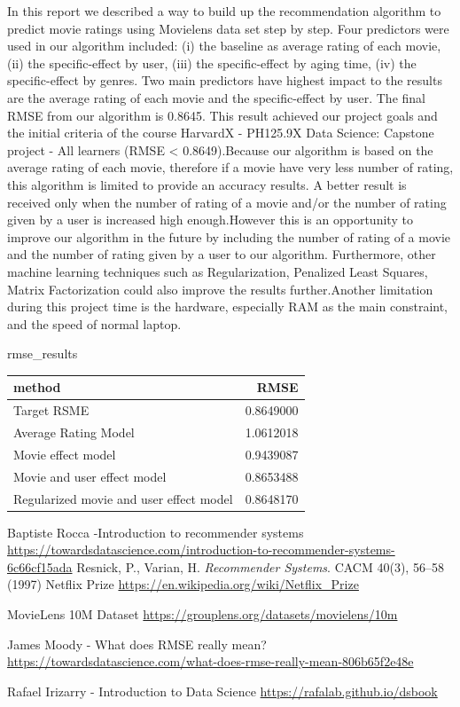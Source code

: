 \documentclass[]{article}
\newenvironment{Shaded}{\begin{snugshade}}{\end{snugshade}}
\newcommand{\NormalTok}[1]{#1}
\begin{document}
In this report we described a way to build up the recommendation
algorithm to predict movie ratings using Movielens data set step by
step. Four predictors were used in our algorithm included: (i) the
baseline as average rating of each movie, (ii) the specific-effect by
user, (iii) the specific-effect by aging time, (iv) the specific-effect
by genres. Two main predictors have highest impact to the results are
the average rating of each movie and the specific-effect by user. The
final RMSE from our algorithm is 0.8645. This result achieved our
project goals and the initial criteria of the course HarvardX - PH125.9X
Data Science: Capstone project - All learners (RMSE \textless{}
0.8649).Because our algorithm is based on the average rating of each
movie, therefore if a movie have very less number of rating, this
algorithm is limited to provide an accuracy results. A better result is
received only when the number of rating of a movie and/or the number of
rating given by a user is increased high enough.However this is an
opportunity to improve our algorithm in the future by including the
number of rating of a movie and the number of rating given by a user to
our algorithm. Furthermore, other machine learning techniques such as
Regularization, Penalized Least Squares, Matrix Factorization could also
improve the results further.Another limitation during this project time
is the hardware, especially RAM as the main constraint, and the speed of
normal laptop.

\begin{Shaded}
\begin{Highlighting}[]
\NormalTok{rmse_results}
\end{Highlighting}
\end{Shaded}

\begin{longtable}[]{@{}lr@{}}
\toprule
method & RMSE\tabularnewline
\midrule
\endhead
Target RSME & 0.8649000\tabularnewline
Average Rating Model & 1.0612018\tabularnewline
Movie effect model & 0.9439087\tabularnewline
Movie and user effect model & 0.8653488\tabularnewline
Regularized movie and user effect model & 0.8648170\tabularnewline
\bottomrule
\end{longtable}

\begin{thebibliography}{9}
Baptiste Rocca -Introduction to recommender systems \url{https://towardsdatascience.com/introduction-to-recommender-systems-6c66cf15ada}
Resnick, P., Varian, H. \textit{Recommender Systems}. CACM 40(3), 56–58 (1997)
Netflix Prize \url{https://en.wikipedia.org/wiki/Netflix_Prize}

MovieLens 10M Dataset \url{https://grouplens.org/datasets/movielens/10m}

James Moody - What does RMSE really mean? \url{https://towardsdatascience.com/what-does-rmse-really-mean-806b65f2e48e}

Rafael Irizarry - Introduction to Data Science \url{https://rafalab.github.io/dsbook}


\end{thebibliography}
\end{document}

